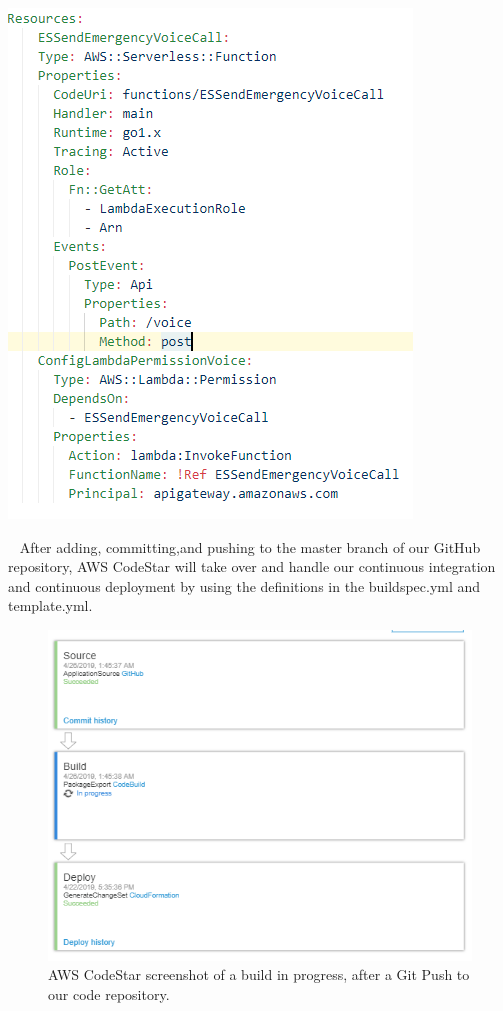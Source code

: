 \documentclass[10pt, a4paper]{article}
\begin{document}
\begin{enumerate}
	\begin{center}
		\includegraphics[scale=1]{code-screenshots/deploy-template.PNG}
	\end{center}
\end{enumerate}

\par ~ After adding, committing,and pushing to the master branch of our GitHub repository, AWS CodeStar will take over and handle our continuous integration and continuous deployment by using the definitions in the buildspec.yml and template.yml.

\begin{figure}[H]
\begin{center}
  \includegraphics[scale=.7]{build-in-progress.PNG}
  \caption{AWS CodeStar screenshot of a build in progress, after a Git Push to our code repository.}
\end{center}
\end{figure}
\end{document}
